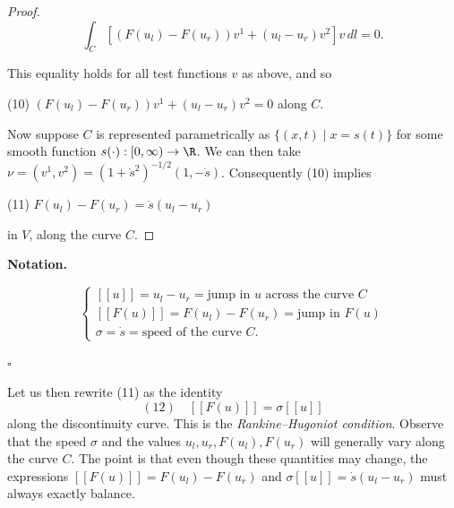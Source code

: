 \begin{proof}
$$\int_C [(F(u_l) - F(u_r))v^1 + (u_l - u_r)v^2] v \, dl = 0.$$

This equality holds for all test functions $v$ as above, and so

(10) \quad $(F(u_l) - F(u_r))v^1 + (u_l - u_r)v^2 = 0$ \quad along $C$.

Now suppose $C$ is represented parametrically as $\{(x,t) \mid x = s(t)\}$ for some smooth function $s(\cdot) : [0, \infty) \to \R$. We can then take $\nu = (v^1, v^2) = (1 + \dot{s}^2)^{-1/2}(1, -\dot{s})$. Consequently (10) implies

(11) \quad $F(u_l) - F(u_r) = \dot{s}(u_l - u_r)$

in $V$, along the curve $C$.
\end{proof}

\textbf{Notation.}

$$\begin{cases}
[[u]] = u_l - u_r = \text{jump in } u \text{ across the curve } C \\
[[F(u)]] = F(u_l) - F(u_r) = \text{jump in } F(u) \\
\sigma = \dot{s} = \text{speed of the curve } C.
\end{cases}$$

$\square$

Let us then rewrite (11) as the identity
$$(12) \quad [[F(u)]] = \sigma[[u]]$$
along the discontinuity curve. This is the \textit{Rankine--Hugoniot condition}. Observe that the speed $\sigma$ and the values $u_l, u_r, F(u_l), F(u_r)$ will generally vary along the curve $C$. The point is that even though these quantities may change, the expressions $[[F(u)]] = F(u_l) - F(u_r)$ and $\sigma[[u]] = \dot{s}(u_l - u_r)$ must always exactly balance.

